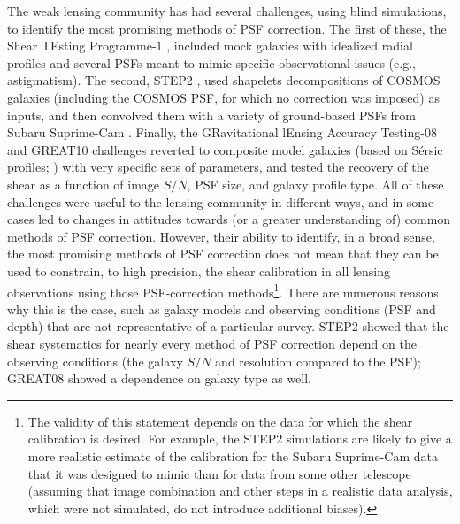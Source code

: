 \documentclass[twocolumn,useAMS,usenatbib]{mn2e}
\newcommand{\newtext}{}
\begin{document}
The weak lensing community has had several challenges, using blind
simulations, to identify the most promising methods of PSF correction.
The first of these, the Shear TEsting Programme-1
\citep[STEP1;][]{2006MNRAS.368.1323H}, included mock galaxies with
idealized radial profiles and several PSFs meant to mimic specific
observational issues (e.g., astigmatism).  The second, STEP2
\citep{2007MNRAS.376...13M}, used shapelets
\citep{2003MNRAS.338...35R,2003MNRAS.338...48R} decompositions of
COSMOS galaxies (including the COSMOS PSF, for which no correction was
imposed) as inputs, and then convolved them with a variety of
ground-based PSFs from Subaru Suprime-Cam \citep{2002PASJ...54..833M}.  Finally, the GRavitational
lEnsing Accuracy Testing-08
\citep[GREAT08;][]{2009AnApS...3....6B,2010MNRAS.405.2044B} and
GREAT10 \citep{2010arXiv1009.0779K} challenges reverted to composite
model galaxies (based on S\'ersic profiles;
\citealt{1968adga.book.....S}) with very specific sets of parameters,
and tested the recovery of the shear as a function of image $S/N$, PSF
size, and galaxy profile type.  All of these challenges were useful to
the lensing community in different ways, and in some cases led to
changes in attitudes towards (or a greater understanding of) common
methods of PSF correction.  However, their ability to identify, in a
broad sense, the most promising methods of PSF correction does not
mean that they can be used to constrain, to high precision, the shear
calibration in \newtext{all lensing observations} using those
PSF-correction methods\footnote{\newtext{The validity of this
    statement depends on the data for which the shear calibration is
    desired.  For example, the STEP2 simulations are likely to give a
    more realistic estimate of the calibration for the Subaru
    Suprime-Cam data that it was designed to mimic than for data from
    some other telescope (assuming that image combination and other
    steps in a realistic data analysis, which were not simulated, do
    not introduce additional biases).}}.  There are numerous reasons
why this is the case, such as galaxy models and observing conditions
(PSF and depth) that are not representative of a particular
survey. STEP2 \citep{2007MNRAS.376...13M} showed that the shear
systematics for nearly every method of PSF correction depend on the
observing conditions (the galaxy $S/N$ and resolution compared to the
PSF); GREAT08 \citep{2010MNRAS.405.2044B} showed a dependence on
galaxy type as well.
\end{document}
